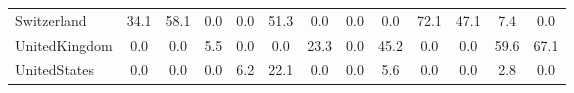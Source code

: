\begin{table}[htbp]
\begin{tabular}{lcccccccccccc}
Switzerland &      34.1 &      58.1 &       0.0 &       0.0 &      51.3 &       0.0 &       0.0 &       0.0 &      72.1 &      47.1 &       7.4 &       0.0 \\  
UnitedKingdom &       0.0 &       0.0 &       5.5 &       0.0 &       0.0 &      23.3 &       0.0 &      45.2 &       0.0 &       0.0 &      59.6 &      67.1 \\  
UnitedStates &       0.0 &       0.0 &       0.0 &       6.2 &      22.1 &       0.0 &       0.0 &       5.6 &       0.0 &       0.0 &       2.8 &       0.0 \\  
\hline \hline \end{tabular}
\end{table}
